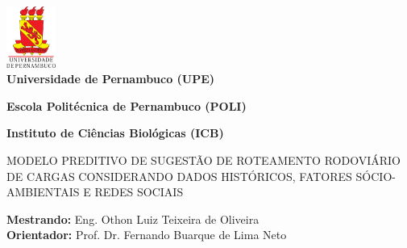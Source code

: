 
\thispagestyle{empty}

\begin{center}

\includegraphics[height=20mm]{Figuras/Capa/brasao_upe.eps}\\


{\textbf{Universidade de Pernambuco (UPE)}}%

{\textbf{Escola Politécnica de Pernambuco (POLI)}}%

{\textbf{Instituto de Ciências Biológicas (ICB)}} \\ \vspace{2ex}

\vspace{1ex}

\vspace{1.3in}

{\Large MODELO PREDITIVO DE SUGESTÃO DE ROTEAMENTO RODOVIÁRIO DE CARGAS CONSIDERANDO DADOS HISTÓRICOS, FATORES SÓCIO-AMBIENTAIS E REDES SOCIAIS} \\ 

\vspace{0.3in}


\vspace{1.2ex}

\begin{center}

\vspace{1ex} {\textbf{Mestrando:} Eng. Othon Luiz Teixeira de Oliveira \\
	      \textbf{Orientador:} Prof. Dr. Fernando Buarque de Lima Neto }


\end{center}
\end{center}
